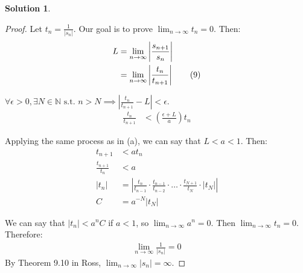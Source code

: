 \documentclass[12pt]{article}
\theoremstyle{definition} %
\newtheorem{solution}{Solution}
\theoremstyle{plain} %
\begin{document}
\begin{solution}
\begin{enumerate}
    \begin{proof}
        Let $t_n = \frac{1}{|s_n|}$. Our goal is to prove $\lim_{n \to \infty} t_n = 0.$ Then:
        \begin{align}
            L &= \lim_{n \to \infty} \left| \frac{s_{n+1}}{s_n} \right| \notag \\
            &= \lim_{n \to \infty} \left| \frac{t_n}{t_{n+1}} \right| \tag{9}
        \end{align}
    
        $\forall \epsilon > 0, \exists N \in \mathbb{N} \text{ s.t. } n > N \implies \left| \frac{t_n}{t_{n+1}} - L \right| < \epsilon.$
        \begin{align}
            \frac{t_n}{t_{n+1}} &< \left( \frac{\epsilon + L}{a} \right) t_n \tag{11}
        \end{align}
    
        Applying the same process as in (a), we can say that $L < a < 1.$ Then:
        \begin{align}
            t_{n+1} &< at_n \tag{12} \\
            \frac{t_{n+1}}{t_n} &< a \tag{13} \\
            |t_n| &= \left| \frac{t_n}{t_{n-1}} \cdot \frac{t_{n-1}}{t_{n-2}} \cdot \dots \cdot \frac{t_{N+1}}{t_N} \cdot |t_N| \right| \tag{14} \\
            C &= a^{-N} |t_N| \tag{15}
        \end{align}
    
        We can say that $|t_n| < a^n C$ if $a < 1$, so $\lim_{n \to \infty} a^n = 0.$ Then $\lim_{n \to \infty} t_n = 0.$ Therefore:
        \begin{align}
            \lim_{n \to \infty} \frac{1}{|s_n|} = 0 \tag{16}
        \end{align}
        By Theorem 9.10 in Ross, $\lim_{n \to \infty} |s_n| = \infty.$ 
    \end{proof}

    \end{enumerate}
    \end{solution}
\end{document}
